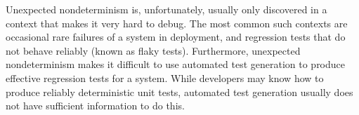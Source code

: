 \begin{comment}
Because the
programmer's abstraction of the system ignores a large number of
details, very few tests are ``deterministic'' in the sense
that they eliminate all changes between executions.  Running the same test
twice almost always results in differences, given a low enough level of
abstraction, since the system load,
cache contents, branch predictor history, etc. are almost never
controlled for; however, what matters is when
some kind of nondeterminism unexpectedly impacts computed values at a
higher level of abstraction.
\end{comment}

\begin{comment} in general, if the operating system
itself is not buggy, low-level nondeterminism, by design, is invisible
except in fine-grained performance testing or real-time systems.
Unexpected nondeterminism usually arises when there is an element of higher-level
state or input that \emph{is} critical to the produced behavior, but
the programmer has not anticipated.  E.g.,  when it is believed that the
behavior of a thread scheduler will not matter, but a race condition
in the code means that it does matter, or when the order of items in
an iterator on a hash table is important, and the hash values used are
randomly salted.
\end{comment}


Unexpected nondeterminism is, unfortunately, usually only discovered
in a context that makes it very hard to debug.   The most common such
contexts are occasional rare failures of a system in deployment, and
regression tests that do not behave reliably (known as flaky tests).
Furthermore, unexpected nondeterminism makes it difficult to use
automated test generation to produce effective regression tests for a
system.  While developers may know how to produce reliably
deterministic unit tests, automated test generation usually does not
have sufficient information to do this.


